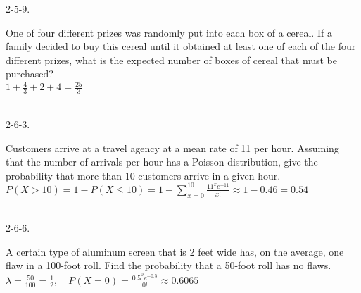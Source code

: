 \documentclass[12pt]{book}
\begin{document}
\begin{CJK}{UTF8}{bsmi}
2-5-9. \begin{minipage}[t]{\dimexpr\linewidth-2em}
One of four different prizes was randomly put into each box of a cereal. If a family decided to buy this cereal until it obtained at least one of each of the four different prizes, what is the expected number of boxes of cereal that must be purchased? \\
$\displaystyle 1+\frac{4}{3}+2+4=\frac{25}{3}$
\end{minipage}\\

2-6-3. \begin{minipage}[t]{\dimexpr\linewidth-2em}
Customers arrive at a travel agency at a mean rate of 11 per hour. Assuming that the number of arrivals per hour has a Poisson distribution, give the probability that more than 10 customers arrive in a given hour. \\
$\displaystyle P(X>10)=1-P(X\le10)=1-\sum_{x=0}^{10}\frac{11^xe^{-11}}{x!}\approx1-0.46=0.54$
\end{minipage}\\

2-6-6. \begin{minipage}[t]{\dimexpr\linewidth-2em}
A certain type of aluminum screen that is 2 feet wide has, on the average, one flaw in a 100-foot roll. Find the probability that a 50-foot roll has no flaws. \\
$\displaystyle \lambda=\frac{50}{100}=\frac{1}{2},\quad P(X=0)=\frac{0.5^0e^{-0.5}}{0!}\approx0.6065$
\end{minipage}\\

\end{CJK}
\end{document}
